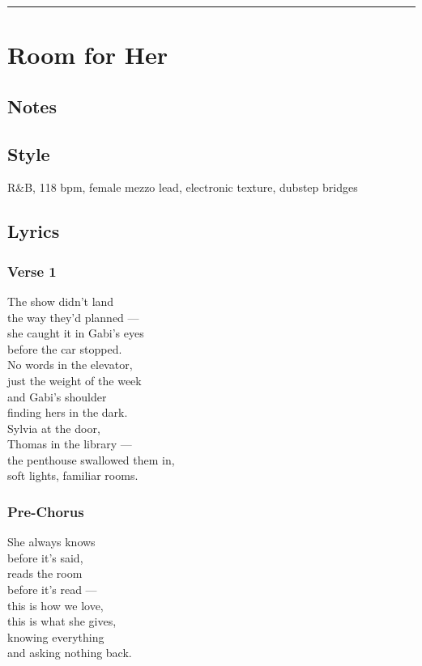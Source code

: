 \begin{center}\rule{0.5\linewidth}{0.5pt}\end{center}

\section{Room for Her}\label{room-for-her}

\subsection{Notes}\label{notes-31}

\subsection{Style}\label{style-30}

R\&B, 118 bpm, female mezzo lead, electronic texture, dubstep bridges

\subsection{Lyrics}\label{lyrics-30}

\subsubsection{Verse 1}\label{verse-1-26}

The show didn't land\\
the way they'd planned ---\\
she caught it in Gabi's eyes\\
before the car stopped.\\
No words in the elevator,\\
just the weight of the week\\
and Gabi's shoulder\\
finding hers in the dark.\\
Sylvia at the door,\\
Thomas in the library ---\\
the penthouse swallowed them in,\\
soft lights, familiar rooms.

\subsubsection{Pre-Chorus}\label{pre-chorus-44}

She always knows\\
before it's said,\\
reads the room\\
before it's read ---\\
this is how we love,\\
this is what she gives,\\
knowing everything\\
and asking nothing back.


